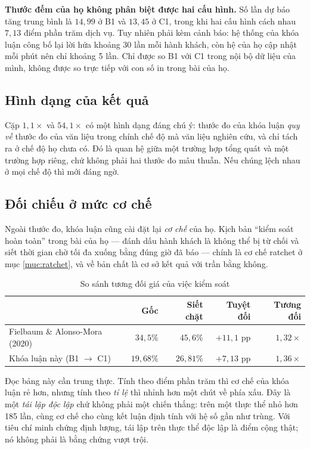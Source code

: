 \textbf{Thước đếm của họ không phân biệt được hai cấu hình.} Số lần dự báo tăng trung bình là
$14{,}99$ ở B1 và $13{,}45$ ở C1, trong khi hai cấu hình cách nhau $7{,}13$ điểm phần trăm dịch
vụ. Tuy nhiên phải kèm cảnh báo: hệ thống của khóa luận công bố lại lời hứa khoảng 30 lần mỗi
hành khách, còn hệ của họ cập nhật mỗi phút nên chỉ khoảng 5 lần. Chỉ được so B1 với C1 trong
nội bộ dữ liệu của mình, không được so trực tiếp với con số in trong bài của họ.

\subsection{Hình dạng của kết quả}

Cặp $1{,}1\times$ và $54{,}1\times$ có một hình dạng đáng chú ý: thước đo của khóa luận
\emph{quy về} thước đo của văn liệu trong chính chế độ mà văn liệu nghiên cứu, và chỉ tách ra ở
chế độ họ chưa có. Đó là quan hệ giữa một trường hợp tổng quát và một trường hợp riêng, chứ
không phải hai thước đo mâu thuẫn. Nếu chúng lệch nhau ở mọi chế độ thì mới đáng ngờ.

\subsection{Đối chiếu ở mức cơ chế}

Ngoài thước đo, khóa luận cũng cài đặt lại \emph{cơ chế} của họ. Kịch bản ``kiểm soát hoàn
toàn'' trong bài của họ --- đánh dấu hành khách là không thể bị từ chối và siết thời gian chờ
tối đa xuống bằng đúng giờ đã báo --- chính là cơ chế ratchet ở mục \ref{muc:ratchet}, và về bản chất là cơ
sở kết quả với trần bằng không.

\begin{table}[htbp]
\centering
\caption{So sánh tương đối giá của việc kiểm soát}
\label{bang:sosanh-tuongdoi}
\small
\begin{tabular}{@{}lrrrr@{}}
\toprule
& \textbf{Gốc} & \textbf{Siết chặt} & \textbf{Tuyệt đối} & \textbf{Tương đối}\\
\midrule
Fielbaum \& Alonso-Mora (2020) & $34{,}5\%$ & $45{,}6\%$ & $+11{,}1$ pp & $1{,}32\times$\\
Khóa luận này (B1 $\to$ C1) & $19{,}68\%$ & $26{,}81\%$ & $+7{,}13$ pp & $1{,}36\times$\\
\bottomrule
\end{tabular}
\end{table}

Đọc bảng này cần trung thực. Tính theo điểm phần trăm thì cơ chế của khóa luận rẻ hơn, nhưng
tính theo \emph{tỉ lệ} thì nhỉnh hơn một chút về phía xấu. Đây là một \emph{tái lập độc lập}
chứ không phải một chiến thắng: trên một thực thể nhỏ hơn 185 lần, cùng cơ chế cho cùng kết luận
định tính với hệ số gần như trùng. Với tiêu chí minh chứng định lượng, tái lập trên thực thể độc
lập là điểm cộng thật; nó không phải là bằng chứng vượt trội.

